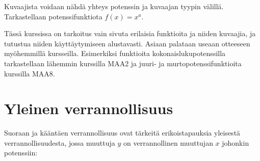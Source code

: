 Kuvaajista voidaan nähdä yhteys potenssin ja kuvaajan tyypin välillä. Tarkastellaan potenssifunktiota $f(x)=x^a$.


%	

Tässä kurssissa on tarkoitus vain sivuta erilaisia funktioita ja niiden kuvaajia, ja tutustua niiden käyttäytymiseen alustavasti. Asiaan palataan useaan otteeseen myöhemmillä kursseilla. Esimerkiksi funktioita kokonaislukupotenssilla tarkastellaan lähemmin kurssilla MAA2 ja juuri- ja murtopotenssifunktioita kurssilla MAA8.

\section*{Yleinen verrannollisuus}

Suoraan ja kääntäen verrannollisuus ovat tärkeitä erikoistapauksia yleisestä verrannollisuudesta, jossa muuttuja $y$ on verrannollinen muuttujan $x$ johonkin potenssiin:

